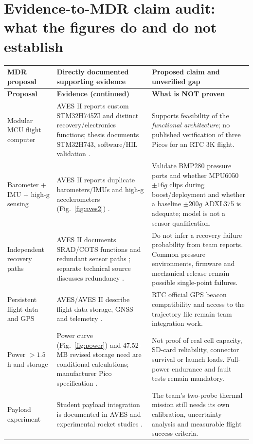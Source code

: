 \documentclass[10pt,a4paper]{article}
\begin{document}
\section{Evidence-to-MDR claim audit: what the figures do and do not establish}
\small
\begin{longtable}{@{}L{31mm}L{57mm}L{55mm}@{}}
\toprule{}\textbf{MDR proposal} & \textbf{Directly documented supporting evidence} & \textbf{Proposed claim and unverified gap}\\\midrule\endfirsthead
\toprule{}\textbf{Proposal} & \textbf{Evidence (continued)} & \textbf{What is NOT proven}\\\midrule\endhead
\bottomrule\endlastfoot
Modular MCU flight computer & AVES II reports custom STM32H745ZI and distinct recovery/electronics functions; thesis documents STM32H743, software/HIL validation \cite{astg2022aves2,zlamala2024}. & Supports feasibility of the \emph{functional architecture}; no published verification of three Picos for an RTC 3K flight.\\
Barometer + IMU + high-g sensing & AVES II reports duplicate barometers/IMUs and high-g accelerometers (Fig.~\ref{fig:aves2}) \cite{astg2022aves2}. & Validate BMP280 pressure ports and whether MPU6050 $\pm16g$ clips during boost/deployment and whether a baseline $\pm200g$ ADXL375 is adequate; model is not a sensor qualification.\\
Independent recovery paths & AVES II documents SRAD/COTS functions and redundant sensor paths \cite{astg2022aves2}; separate technical source discusses redundancy \cite{kahe2017}. & Do not infer a recovery failure probability from team reports. Common pressure environments, firmware and mechanical release remain possible single-point failures.\\
Persistent flight data and GPS & AVES/AVES II describe flight-data storage, GNSS and telemetry \cite{astg2021aves,astg2022aves2}. & RTC official GPS beacon compatibility and access to the trajectory file remain team integration work.\\
Power $>1.5$ h and storage & Power curve (Fig.~\ref{fig:power}) and 47.52-MB revised storage need are conditional calculations; manufacturer Pico specification \cite{rpicopico}. & Not proof of real cell capacity, SD-card reliability, connector survival or launch loads. Full-power endurance and fault tests remain mandatory.\\
Payload experiment & Student payload integration is documented in AVES and experimental rocket studies \cite{astg2021aves,bakirci2022}. & The team's two-probe thermal mission still needs its own calibration, uncertainty analysis and measurable flight success criteria.\\
\end{longtable}
\normalsize
\end{document}
